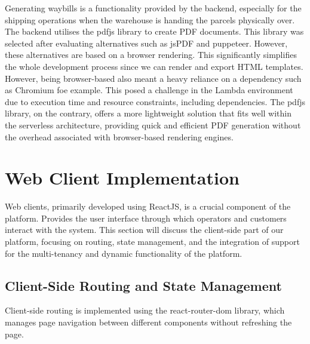 Generating waybills is a functionality provided by the backend, especially for the shipping operations when the warehouse is handing the parcels physically over.
The backend utilises the \gls{pdfjs} library to create PDF documents.
This library was selected after evaluating alternatives such as \gls{jsPDF} and \gls{puppeteer}.
However, these alternatives are based on a browser rendering.
This significantly simplifies the whole development process since we can render and export HTML templates.
However, being browser-based also meant a heavy reliance on a dependency such as \Gls{Chromium} foe example. 
This posed a challenge in the Lambda environment due to execution time and resource constraints, including dependencies.
The \gls{pdfjs} library, on the contrary, offers a more lightweight solution that fits well within the serverless architecture, providing quick and efficient PDF generation without the overhead associated with browser-based rendering engines.

\section{Web Client Implementation}
\label{sec:web-client-implementation}

Web clients, primarily developed using ReactJS, is a crucial component of the platform.
Provides the user interface through which operators and customers interact with the system.
This section will discuss the client-side part of our platform, focusing on routing, state management, and the integration of support for the multi-tenancy and dynamic functionality of the platform.

\subsection{Client-Side Routing and State Management}
\label{subsec:client-side-routing-state}
Client-side routing is implemented using the \gls{react-router-dom} library, which manages page navigation between different components without refreshing the page. 

